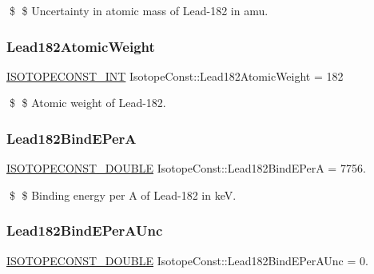 \$ \$ Uncertainty in atomic mass of Lead-\/182 in amu. \mbox{\label{group___isotope_const-_lead-_pb182_ga901dc49d8501b20e3f3635a6f9dec099}} 
\subsubsection{\texorpdfstring{Lead182\+Atomic\+Weight}{Lead182AtomicWeight}}
{\footnotesize\ttfamily \mbox{\hyperlink{group___isotope_const-_macros_ga5f18360b3e99483a35c32d789e62621c}{I\+S\+O\+T\+O\+P\+E\+C\+O\+N\+S\+T\+\_\+\+I\+NT}} Isotope\+Const\+::\+Lead182\+Atomic\+Weight = 182}

\$ \$ Atomic weight of Lead-\/182. \mbox{\label{group___isotope_const-_lead-_pb182_gaa5ea4b28c528c6ea6468e4bca1704664}} 
\subsubsection{\texorpdfstring{Lead182\+Bind\+E\+PerA}{Lead182BindEPerA}}
{\footnotesize\ttfamily \mbox{\hyperlink{group___isotope_const-_macros_ga8f45a7272ce02c0b4c65c44636ed719a}{I\+S\+O\+T\+O\+P\+E\+C\+O\+N\+S\+T\+\_\+\+D\+O\+U\+B\+LE}} Isotope\+Const\+::\+Lead182\+Bind\+E\+PerA = 7756.}

\$ \$ Binding energy per A of Lead-\/182 in keV. \mbox{\label{group___isotope_const-_lead-_pb182_gaa439bdfa62f79c519bdef37177389c47}} 
\subsubsection{\texorpdfstring{Lead182\+Bind\+E\+Per\+A\+Unc}{Lead182BindEPerAUnc}}
{\footnotesize\ttfamily \mbox{\hyperlink{group___isotope_const-_macros_ga8f45a7272ce02c0b4c65c44636ed719a}{I\+S\+O\+T\+O\+P\+E\+C\+O\+N\+S\+T\+\_\+\+D\+O\+U\+B\+LE}} Isotope\+Const\+::\+Lead182\+Bind\+E\+Per\+A\+Unc = 0.}

